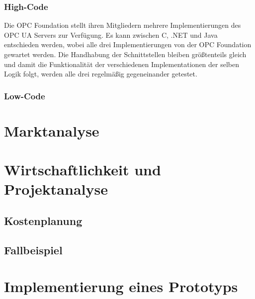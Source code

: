 \documentclass[a4paper, 12pt, oneside]{scrbook}
\begin{document}
			\subsubsection{High-Code}
			
			Die OPC Foundation stellt ihren Mitgliedern mehrere Implementierungen des OPC UA Servers zur Verfügung. Es kann zwischen C, .NET und Java entschieden werden, wobei alle drei Implementierungen von der OPC Foundation gewartet werden. Die Handhabung der Schnittstellen bleiben größtenteils gleich und damit die Funktionalität der verschiedenen Implementationen der selben Logik folgt, werden alle drei regelmäßig gegeneinander getestet.
			
			
			
			
			
			\subsubsection{Low-Code}
			
			
			
	
	\section{Marktanalyse}
	
	
	\section{Wirtschaftlichkeit und Projektanalyse}
	
		\subsection{Kostenplanung}
		
		\subsection{Fallbeispiel}
	
	\section{Implementierung eines Prototyps}
	
\end{document}
